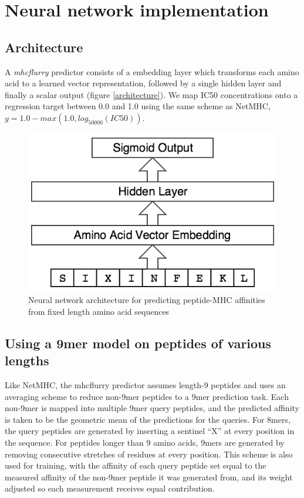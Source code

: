 \section{Neural network implementation}
\subsection{Architecture}
A {\it mhcflurry} predictor consists of a embedding layer which transforms each amino acid to a learned vector representation, followed by a single hidden layer and finally a scalar output (figure \ref{architecture}). We map IC50 concentrations onto a regression target between 0.0 and 1.0 using the same scheme as NetMHC, $y = 1.0 - max(1.0, log_{50000}(IC50))$.

\begin{figure}[h]
\centering
\includegraphics[scale=0.5]{figures/mhcflurry-gliffy-network.png}
\caption{Neural network architecture for predicting peptide-MHC affinities from fixed length amino acid sequences}
\label{fig:architecture}
\end{figure}

\subsection{Using a 9mer model on peptides of various lengths}
Like NetMHC\cite{lundegaard2008accurate}, the mhcflurry predictor assumes length-9 peptides and uses an averaging scheme to reduce non-9mer peptides to a 9mer prediction task. Each non-9mer is mapped into multiple 9mer query peptides, and the predicted affinity is taken to be the geometric mean of the predictions for the queries. For 8mers, the query peptides are generated by inserting a sentinel ``X'' at every position in the sequence. For peptides longer than 9 amino acids, 9mers are generated by removing consecutive stretches of residues at every position. This scheme is also used for training, with the affinity of each query peptide set equal to the measured affinity of the non-9mer peptide it was generated from, and its weight adjusted so each measurement receives equal contribution.

